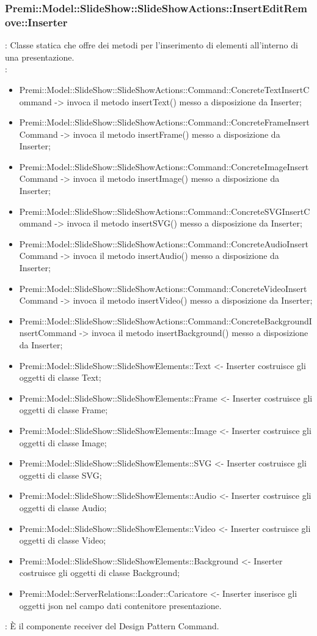 	\subsubsection{Premi::Model::SlideShow::SlideShowActions::InsertEditRemove::Inserter}{
		\textbf{\tipo}: Classe statica che offre dei metodi per l’inserimento di elementi all’interno di una presentazione.\\	
		\textbf{\relaz}:
		\begin{itemize}
			\item Premi::Model::SlideShow::SlideShowActions::Command::ConcreteTextInsertCommand -> invoca il metodo insertText() messo a disposizione da Inserter;
			\item Premi::Model::SlideShow::SlideShowActions::Command::ConcreteFrameInsertCommand -> invoca il metodo insertFrame() messo a disposizione da Inserter;
			\item Premi::Model::SlideShow::SlideShowActions::Command::ConcreteImageInsertCommand -> invoca il metodo insertImage() messo a disposizione da Inserter;
			\item Premi::Model::SlideShow::SlideShowActions::Command::ConcreteSVGInsertCommand -> invoca il metodo insertSVG() messo a disposizione da Inserter;
			\item Premi::Model::SlideShow::SlideShowActions::Command::ConcreteAudioInsertCommand -> invoca il metodo insertAudio() messo a disposizione da Inserter;
			\item Premi::Model::SlideShow::SlideShowActions::Command::ConcreteVideoInsertCommand -> invoca il metodo insertVideo() messo a disposizione da Inserter;
			\item Premi::Model::SlideShow::SlideShowActions::Command::ConcreteBackgroundInsertCommand -> invoca il metodo insertBackground() messo a disposizione da Inserter;
            \item Premi::Model::SlideShow::SlideShowElements::Text <- Inserter costruisce gli oggetti di classe Text;
            \item Premi::Model::SlideShow::SlideShowElements::Frame <- Inserter costruisce gli oggetti di classe Frame;
            \item Premi::Model::SlideShow::SlideShowElements::Image <- Inserter costruisce gli oggetti di classe Image;
            \item Premi::Model::SlideShow::SlideShowElements::SVG <- Inserter costruisce gli oggetti di classe SVG;
            \item Premi::Model::SlideShow::SlideShowElements::Audio <- Inserter costruisce gli oggetti di classe Audio;
            \item Premi::Model::SlideShow::SlideShowElements::Video <- Inserter costruisce gli oggetti di classe Video;
            \item Premi::Model::SlideShow::SlideShowElements::Background <- Inserter costruisce gli oggetti di classe Background;
            \item Premi::Model::ServerRelations::Loader::Caricatore <- Inserter inserisce gli oggetti json nel campo dati contenitore presentazione.
		\end{itemize} 
		\textbf{\interfacce}: È il componente receiver del Design Pattern Command.\\
	}
	
